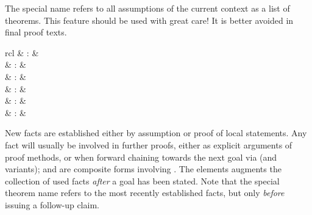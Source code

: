 \begin{isabellebody}
\begin{isamarkuptext}
  The special name \hyperlink{fact.prems}{\mbox{}} refers to all assumptions of the
  current context as a list of theorems.  This feature should be used
  with great care!  It is better avoided in final proof texts.%
\end{isamarkuptext}%
\isamarkuptrue%
%
\isamarkuptrue%
%
\begin{isamarkuptext}%
\begin{matharray}{rcl}
    \hypertarget{command.note}{\hyperlink{command.note}{\mbox{}}} & : &  \\
    \hypertarget{command.then}{\hyperlink{command.then}{\mbox{}}} & : &  \\
    \hypertarget{command.from}{\hyperlink{command.from}{\mbox{}}} & : &  \\
    \hypertarget{command.with}{\hyperlink{command.with}{\mbox{}}} & : &  \\
    \hypertarget{command.using}{\hyperlink{command.using}{\mbox{}}} & : &  \\
    \hypertarget{command.unfolding}{\hyperlink{command.unfolding}{\mbox{}}} & : &  \\
  \end{matharray}

  New facts are established either by assumption or proof of local
  statements.  Any fact will usually be involved in further proofs,
  either as explicit arguments of proof methods, or when forward
  chaining towards the next goal via \hyperlink{command.then}{\mbox{}} (and variants);
  \hyperlink{command.from}{\mbox{}} and \hyperlink{command.with}{\mbox{}} are composite forms
  involving \hyperlink{command.note}{\mbox{}}.  The \hyperlink{command.using}{\mbox{}} elements
  augments the collection of used facts \emph{after} a goal has been
  stated.  Note that the special theorem name \hyperlink{fact.this}{\mbox{}} refers
  to the most recently established facts, but only \emph{before}
  issuing a follow-up claim.


\end{isamarkuptext}
\end{isabellebody}
